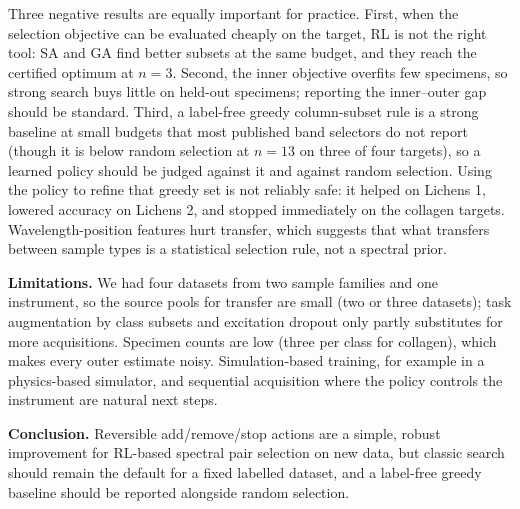 \documentclass[conference]{IEEEtran}
\begin{document}
Three negative results are equally important for practice. First, when the selection objective can be evaluated cheaply on the target, RL is not the right tool: SA and GA find better subsets at the same budget, and they reach the certified optimum at $n=3$. Second, the inner objective overfits few specimens, so strong search buys little on held-out specimens; reporting the inner--outer gap should be standard. Third, a label-free greedy column-subset rule is a strong baseline at small budgets that most published band selectors do not report (though it is below random selection at $n=13$ on three of four targets), so a learned policy should be judged against it and against random selection. Using the policy to refine that greedy set is not reliably safe: it helped on Lichens 1, lowered accuracy on Lichens 2, and stopped immediately on the collagen targets. Wavelength-position features hurt transfer, which suggests that what transfers between sample types is a statistical selection rule, not a spectral prior.

\textbf{Limitations.} We had four datasets from two sample families and one instrument, so the source pools for transfer are small (two or three datasets); task augmentation by class subsets and excitation dropout only partly substitutes for more acquisitions. Specimen counts are low (three per class for collagen), which makes every outer estimate noisy. Simulation-based training, for example in a physics-based simulator, and sequential acquisition where the policy controls the instrument are natural next steps.

\textbf{Conclusion.} Reversible add/remove/stop actions are a simple, robust improvement for RL-based spectral pair selection on new data, but classic search should remain the default for a fixed labelled dataset, and a label-free greedy baseline should be reported alongside random selection. %

\let\oldthebibliography\thebibliography
\renewcommand{\thebibliography}[1]{\oldthebibliography{#1}\setlength{\itemsep}{0pt}\setlength{\parskip}{0pt}}


\end{document}

